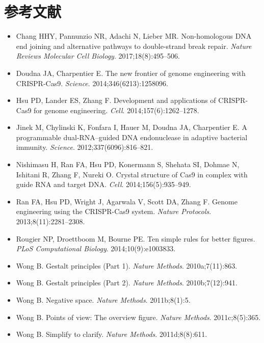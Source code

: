 \section*{参考文献}

{\sloppy
\begin{itemize}
\item Chang HHY, Pannunzio NR, Adachi N, Lieber MR. Non-homologous DNA end joining and alternative pathways to double-strand break repair. \emph{Nature Reviews Molecular Cell Biology}. 2017;18(8):495--506. 
\item Doudna JA, Charpentier E. The new frontier of genome engineering with CRISPR-Cas9. \emph{Science}. 2014;346(6213):1258096. 
\item Hsu PD, Lander ES, Zhang F. Development and applications of CRISPR-Cas9 for genome engineering. \emph{Cell}. 2014;157(6):1262--1278. 
\item Jinek M, Chylinski K, Fonfara I, Hauer M, Doudna JA, Charpentier E. A programmable dual-RNA--guided DNA endonuclease in adaptive bacterial immunity. \emph{Science}. 2012;337(6096):816--821. 
\item Nishimasu H, Ran FA, Hsu PD, Konermann S, Shehata SI, Dohmae N, Ishitani R, Zhang F, Nureki O. Crystal structure of Cas9 in complex with guide RNA and target DNA. \emph{Cell}. 2014;156(5):935--949. 
\item Ran FA, Hsu PD, Wright J, Agarwala V, Scott DA, Zhang F. Genome engineering using the CRISPR-Cas9 system. \emph{Nature Protocols}. 2013;8(11):2281--2308. 
\item Rougier NP, Droettboom M, Bourne PE. Ten simple rules for better figures. \emph{PLoS Computational Biology}. 2014;10(9):e1003833. 
\item Wong B. Gestalt principles (Part 1). \emph{Nature Methods}. 2010a;7(11):863. 
\item Wong B. Gestalt principles (Part 2). \emph{Nature Methods}. 2010b;7(12):941. 
\item Wong B. Negative space. \emph{Nature Methods}. 2011b;8(1):5. 
\item Wong B. Points of view: The overview figure. \emph{Nature Methods}. 2011c;8(5):365. 
\item Wong B. Simplify to clarify. \emph{Nature Methods}. 2011d;8(8):611. 
\end{itemize}
\par}
